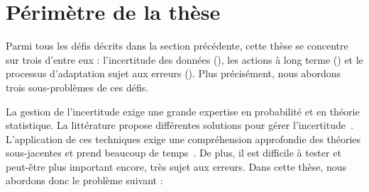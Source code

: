 \section{Périmètre de la thèse}

%
Parmi tous les défis décrits dans la section précédente, cette thèse se concentre sur trois d'entre eux : l'incertitude des données (), les actions à long terme () et le processus d'adaptation sujet aux erreurs (). 
Plus précisément, nous abordons trois sous-problèmes de ces défis.

%
La gestion de l'incertitude exige une grande expertise en probabilité et en théorie statistique.
La littérature propose différentes solutions pour gérer l'incertitude~\cite{zadeh1996fuzzy,metrology2008evaluation,shafer1992dempster}.
L'application de ces techniques exige une compréhension approfondie des théories sous-jacentes et prend beaucoup de temps~\cite{DBLP:conf/quatic/VallecilloMO16}.
De plus, il est difficile à tester et peut-être plus important encore, très sujet aux erreurs.
Dans cette thèse, nous abordons donc le problème suivant :
\vspace{-2em}

